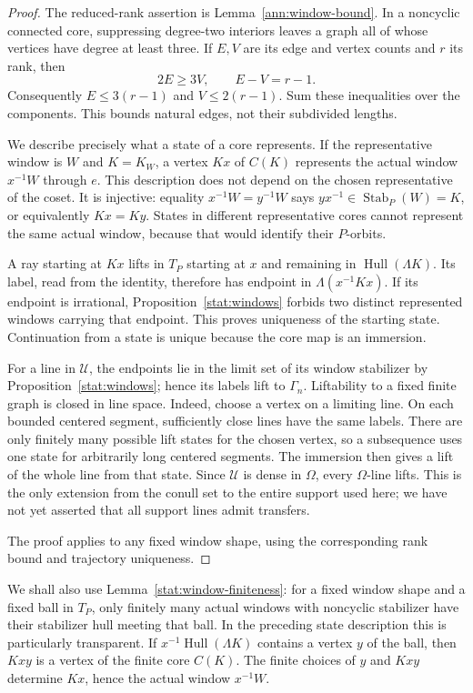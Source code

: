 \begin{proof}
The reduced-rank assertion is Lemma~\ref{ann:window-bound}.  In a
noncyclic connected core, suppressing degree-two interiors leaves a
graph all of whose vertices have degree at least three.  If $E,V$ are
its edge and vertex counts and $r$ its rank, then
\[
 2E\ge3V,\qquad E-V=r-1.
\]
Consequently $E\le3(r-1)$ and $V\le2(r-1)$.  Sum these inequalities
over the components.  This bounds natural edges, not their subdivided
lengths.

We describe precisely what a state of a core represents.  If the
representative window is $W$ and $K=K_W$, a vertex $Kx$ of $C(K)$
represents the actual window $x^{-1}W$ through $e$.  This description
does not depend on the chosen representative of the coset.  It is
injective: equality $x^{-1}W=y^{-1}W$ says
$yx^{-1}\in\operatorname{Stab}_P(W)=K$, or equivalently $Kx=Ky$.
States in different representative cores cannot represent the same
actual window, because that would identify their $P$-orbits.

A ray starting at $Kx$ lifts in $T_P$ starting at $x$ and remaining in
$\operatorname{Hull}(\Lambda K)$.  Its label, read from the identity,
therefore has endpoint in $\Lambda(x^{-1}Kx)$.  If its endpoint is
irrational, Proposition~\ref{stat:windows} forbids two distinct represented
windows carrying that endpoint.  This proves uniqueness of the
starting state.  Continuation from a state is unique because the core
map is an immersion.

For a line in $\mathcal U$, the endpoints lie in the limit set of its
window stabilizer by Proposition~\ref{stat:windows}; hence its labels lift
to $\Gamma_n$.  Liftability to a fixed finite graph is closed in line
space.  Indeed, choose a vertex on a limiting line.  On each bounded
centered segment, sufficiently close lines have the same labels.
There are only finitely many possible lift states for the chosen
vertex, so a subsequence uses one state for arbitrarily long centered
segments.  The immersion then gives a lift of the whole line from
that state.  Since $\mathcal U$ is dense in $\Omega$, every
$\Omega$-line lifts.  This is the only extension from the conull set
to the entire support used here; we have not yet asserted that all
support lines admit transfers.

The proof applies to any fixed window shape, using the corresponding
rank bound and trajectory uniqueness.
\end{proof}

We shall also use Lemma~\ref{stat:window-finiteness}: for a fixed window
shape and a fixed ball in $T_P$, only finitely many actual windows
with noncyclic stabilizer have their stabilizer hull meeting that
ball.  In the preceding state description this is particularly
transparent.  If $x^{-1}\operatorname{Hull}(\Lambda K)$ contains a
vertex $y$ of the ball, then $Kxy$ is a vertex of the finite core
$C(K)$.  The finite choices of $y$ and $Kxy$ determine $Kx$, hence
the actual window $x^{-1}W$.

